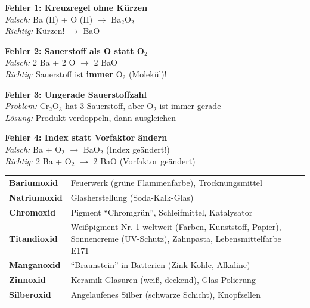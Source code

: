 \documentclass[11pt, a4paper]{article}
\newcommand{\abschnitt}[1]{%
    \vspace{10pt}%
    \noindent{\large\bfseries\textcolor{fachfarbe}{#1}}%
    \vspace{6pt}%
    \nopagebreak[4]%
}
\begin{document}
\begin{schrittbox}
\textbf{Fehler 1: Kreuzregel ohne Kürzen}\\
\textit{Falsch:} Ba (II) + O (II) $\rightarrow$ Ba$_2$O$_2$\\
\textit{Richtig:} Kürzen! $\rightarrow$ BaO

\vspace{6pt}

\textbf{Fehler 2: Sauerstoff als O statt O$_2$}\\
\textit{Falsch:} 2 Ba + 2 O $\rightarrow$ 2 BaO\\
\textit{Richtig:} Sauerstoff ist \textbf{immer} O$_2$ (Molekül)!

\vspace{6pt}

\textbf{Fehler 3: Ungerade Sauerstoffzahl}\\
\textit{Problem:} Cr$_2$O$_3$ hat 3 Sauerstoff, aber O$_2$ ist immer gerade\\
\textit{Lösung:} Produkt verdoppeln, dann ausgleichen

\vspace{6pt}

\textbf{Fehler 4: Index statt Vorfaktor ändern}\\
\textit{Falsch:} Ba + O$_2$ $\rightarrow$ BaO$_2$ (Index geändert!)\\
\textit{Richtig:} 2 Ba + O$_2$ $\rightarrow$ 2 BaO (Vorfaktor geändert)
\end{schrittbox}

\vspace{1em}


\abschnitt{Hintergrundwissen (optional)}

\begin{infobox}
\small
\begin{tabular}{L{2.5cm}L{11cm}}
\textbf{Bariumoxid} & Feuerwerk (grüne Flammenfarbe), Trocknungsmittel \\
\textbf{Natriumoxid} & Glasherstellung (Soda-Kalk-Glas) \\
\textbf{Chromoxid} & Pigment ``Chromgrün'', Schleifmittel, Katalysator \\
\textbf{Titandioxid} & Weißpigment Nr. 1 weltweit (Farben, Kunststoff, Papier), Sonnencreme (UV-Schutz), Zahnpasta, Lebensmittelfarbe E171 \\
\textbf{Manganoxid} & ``Braunstein'' in Batterien (Zink-Kohle, Alkaline) \\
\textbf{Zinnoxid} & Keramik-Glasuren (weiß, deckend), Glas-Polierung \\
\textbf{Silberoxid} & Angelaufenes Silber (schwarze Schicht), Knopfzellen \\
\end{tabular}
\end{infobox}
\end{document}
